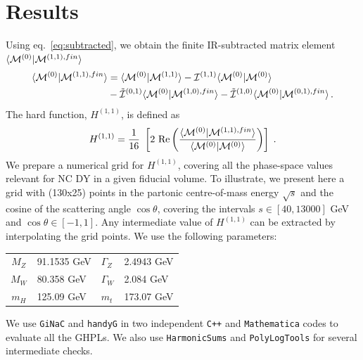 \documentclass[a4paper]{jpconf}
\begin{document}
\section{Results}
\label{sec:results}
% 
Using eq.~\eqref{eq:subtracted}, we obtain the finite IR-subtracted matrix element $\langle \M^{(0)} | \M^{(1,1),fin} \rangle$
% 
\begin{align}
\langle \M^{(0)} | \M^{(1,1),fin} \rangle &= \langle \M^{(0)} | \M^{(1,1)} \rangle -  \I^{(1,1)} \langle \M^{(0)}  | \M^{(0)} \rangle
\nonumber\\&
                                                 - \tilde{\I}^{(0,1)} \langle \M^{(0)} | \M^{(1,0),fin} \rangle
                                                 - \tilde{\I}^{(1,0)} \langle \M^{(0)} | \M^{(0,1),fin} \rangle \,.
\end{align}
% 
The hard function, $H^{(1,1)}$, is  defined as
\begin{equation}
% 
 H^{(1,1)} =
 \frac{1}{16}~
\left[
  2 ~ {\rm Re} \left( \frac{\langle \M^{(0)} | \M^{(1,1),fin} \rangle}{\langle \M^{(0)} | \M^{(0)} \rangle} \right)
\right]
  \;.
\end{equation}
% 
We prepare a numerical grid for ${H}^{(1,1)}$,
covering all the phase-space values relevant for
NC DY in a given fiducial volume.
% 
To illustrate, we present here a grid with (130x25) points in 
the partonic centre-of-mass energy $\sqrt{s}$ and the cosine of the scattering angle $\cos\theta$,
covering the intervals $s\in [40,13000]$ GeV and $\cos\theta\in [-1,1]$.
% 
Any intermediate value of ${H}^{(1,1)}$ can be extracted by interpolating the grid points.
We use the following parameters:
% 
\begin{center}
 \begin{tabular}{c l l l}
 \hline\hline
  $M_Z$ & 91.1535 GeV & $\Gamma_Z$ & 2.4943 GeV\\
  $M_W$ & 80.358 GeV  & $\Gamma_W$ & 2.084 GeV\\
  $m_H$ & 125.09 GeV  & $m_t$ & 173.07 GeV\\
 \hline\hline
 \end{tabular}
% 
\end{center}
%
We use {\tt GiNaC} and {\tt handyG} \cite{Naterop:2019xaf}
in two independent {\tt C++} and {\tt Mathematica} codes to evaluate all the GHPLs.
We also use {\tt HarmonicSums} \cite{Ablinger:2010kw,Ablinger:2014rba} and {\tt PolyLogTools} \cite{Duhr:2019tlz} for several intermediate checks.
\end{document}
